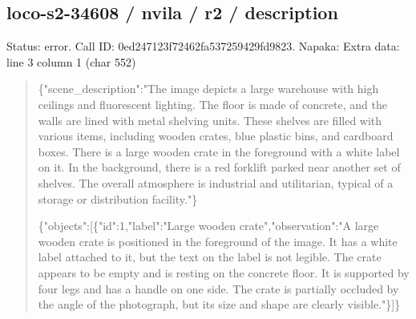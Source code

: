 \documentclass[10pt,a4paper]{article}
\begin{document}
\subsection*{loco-s2-34608 / nvila / r2 / description}
Status: error. Call ID: 0ed247123f72462fa537259429fd9823. Napaka: Extra data: line 3 column 1 (char 552)
\begin{quote}\footnotesize
\{"scene\_description":\allowbreak{}"The image depicts a large warehouse with high ceilings and fluorescent lighting. The floor is made of concrete,\allowbreak{} and the walls are lined with metal shelving units. These shelves are filled with various items,\allowbreak{} including wooden crates,\allowbreak{} blue plastic bins,\allowbreak{} and cardboard boxes. There is a large wooden crate in the foreground with a white label on it. In the background,\allowbreak{} there is a red forklift parked near another set of shelves. The overall atmosphere is industrial and utilitarian,\allowbreak{} typical of a storage or distribution facility."\}\par
\par
\{"objects":\allowbreak{}[\{"id":\allowbreak{}1,\allowbreak{}"label":\allowbreak{}"Lar\allowbreak{}ge wooden crate",\allowbreak{}"observation":\allowbreak{}"A large wooden crate is positioned in the foreground of the image. It has a white label attached to it,\allowbreak{} but the text on the label is not legible. The crate appears to be empty and is resting on the concrete floor. It is supported by four legs and has a handle on one side. The crate is partially occluded by the angle of the photograph,\allowbreak{} but its size and shape are clearly visible."\}]\}
\end{quote}
\end{document}
